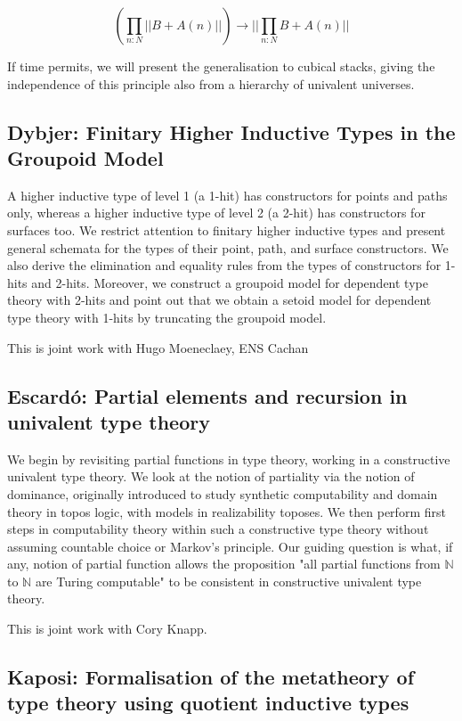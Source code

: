 \documentclass[a4paper,10pt]{scrartcl}
\begin{document}
\[ \left(\prod_{n:N} || B + A(n) ||\right)  \to || \prod_{n:N} B + A(n) || \]

If time permits, we will present the generalisation to cubical stacks, giving the independence of this principle also from a hierarchy of univalent universes.


\subsection*{Dybjer: Finitary Higher Inductive Types in the Groupoid Model}

A higher inductive type of level 1 (a 1-hit) has constructors for points and paths only, whereas a higher inductive type of level 2 (a 2-hit) has constructors for surfaces too. 
We restrict attention to finitary higher inductive types and present general schemata for the types of their point, path, and surface constructors. 
We also derive the elimination and equality rules from the types of constructors for 1-hits and 2-hits. 
Moreover, we construct a groupoid model for dependent type theory with 2-hits and point out that we obtain a setoid model for dependent type theory with 1-hits by truncating the groupoid model.

This is joint work with Hugo Moeneclaey, ENS Cachan

\subsection*{Escardó: Partial elements and recursion in univalent type theory}

We begin by revisiting partial functions in type theory, working in a constructive univalent type theory. 
We look at the notion of partiality via the notion of dominance, originally introduced to study synthetic computability and domain theory in topos logic, with models in realizability toposes. 
We then perform first steps in computability theory within such a constructive type theory without assuming countable choice or Markov's principle. 
Our guiding question is what, if any, notion of partial function allows the proposition "all partial functions from $\mathbb{N}$ to $\mathbb{N}$ are Turing computable" to be consistent in constructive univalent type theory.

This is joint work with Cory Knapp.


\subsection*{Kaposi: Formalisation of the metatheory of type theory using quotient inductive types}
\end{document}
